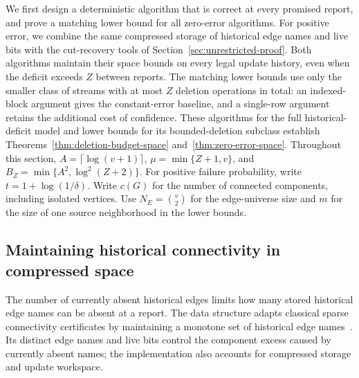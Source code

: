 \documentclass[11pt,letterpaper]{article}
\numberwithin{equation}{section}
\begin{document}
We first design a deterministic algorithm that is correct at every promised report, and prove a matching lower bound for all zero-error algorithms.
For positive error, we combine the same compressed storage of historical edge names and live bits with the cut-recovery tools of Section~\ref{sec:unrestricted-proof}.
Both algorithms maintain their space bounds on every legal update history, even when the deficit exceeds $Z$ between reports.
The matching lower bounds use only the smaller class of streams with at most $Z$ deletion operations in total: an indexed-block argument gives the constant-error baseline, and a single-row argument retains the additional cost of confidence.
These algorithms for the full historical-deficit model and lower bounds for its bounded-deletion subclass establish Theorems~\ref{thm:deletion-budget-space} and~\ref{thm:zero-error-space}.
Throughout this section, $A=\lceil\log(v+1)\rceil$, $\mu=\min\{Z+1,v\}$, and $B_Z=\min\{A^2,\log^2(Z+2)\}$.
For positive failure probability, write $t=1+\log(1/\delta)$.
Write $c(G)$ for the number of connected components, including isolated vertices.
Use $N_E=\binom{v}{2}$ for the edge-universe size and $m$ for the size of one source neighborhood in the lower bounds.

\subsection{Maintaining historical connectivity in compressed space}

The number of currently absent historical edges limits how many stored historical edge names can be absent at a report.
The data structure adapts classical sparse connectivity certificates by maintaining a monotone set of historical edge names~\cite{NagamochiIbaraki1992,JinKapralovMahabadiVakilian2024}.
Its distinct edge names and live bits control the component excess caused by currently absent names; the implementation also accounts for compressed storage and update workspace.
\end{document}
